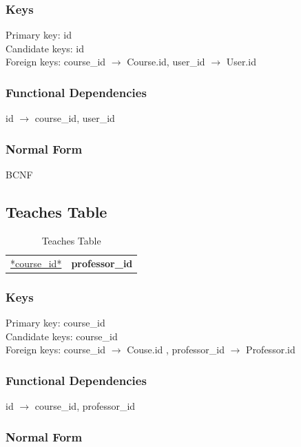 \documentclass[11pt]{article}
\begin{document}
\subsubsection{Keys}
\label{sec-3-6-1}

    
    Primary key: id\\    
    Candidate keys: id\\
    Foreign keys: course\_id $\rightarrow$ Course.id, user\_id $\rightarrow$ User.id
\subsubsection{Functional Dependencies}
\label{sec-3-6-2}


    id $\rightarrow$ course\_id, user\_id
\subsubsection{Normal Form}
\label{sec-3-6-3}


    BCNF
\subsection{Teaches Table}
\label{sec-3-7}


\begin{table}[htb]
\caption{Teaches Table} 
\begin{center}
\begin{tabular}{l|l}
 \underline{*course\_id*}  &  \textbf{professor\_id}  \\
\end{tabular}
\end{center}
\end{table}
\subsubsection{Keys}
\label{sec-3-7-1}

    
    Primary key: course\_id\\    
    Candidate keys: course\_id\\
    Foreign keys: course\_id $\rightarrow$ Couse.id , professor\_id $\rightarrow$ Professor.id
\subsubsection{Functional Dependencies}
\label{sec-3-7-2}


    id $\rightarrow$ course\_id, professor\_id
\subsubsection{Normal Form}
\label{sec-3-7-3}
\end{document}
